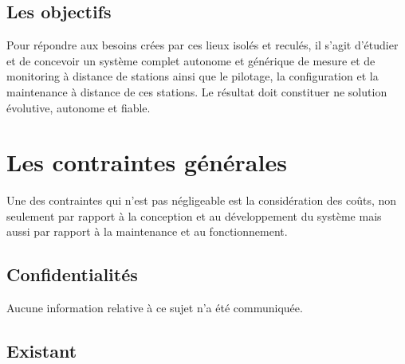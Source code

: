 \subsection{Les objectifs}
Pour répondre aux besoins crées par ces lieux isolés et reculés, il s'agit d'étudier et de concevoir un système complet autonome et générique de mesure et de monitoring à distance de stations ainsi 
que le pilotage, la configuration et la maintenance à distance de ces stations. Le résultat doit constituer ne solution évolutive, autonome et fiable.
\section{Les contraintes générales}
Une des contraintes qui n'est pas négligeable est la considération des coûts, non seulement par rapport à la conception et au développement du système
mais aussi par rapport à la maintenance et au fonctionnement.
\subsection{Confidentialités}
Aucune information relative à ce sujet n'a été communiquée.
\subsection{Existant}

